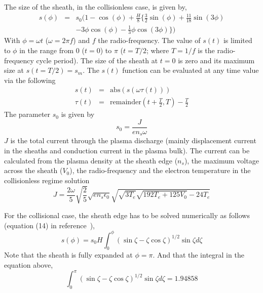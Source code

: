 The size of the sheath, in the collisionless case, is given by, 
\begin{eqnarray}\label{eq:CollisionlessSheathEdge}
s(\phi) &=& s_0 ( 1 - \cos(\phi) + \frac{H}{8} \{ \frac32 \sin(\phi)  + \frac{11}{18} \sin(3 \phi) \nonumber \\ 
        & & - 3 \phi \cos(\phi)  - \frac13 \phi \cos(3 \phi)  \} )
\end{eqnarray}
With $\phi = \omega t$ ($\omega = 2 \pi f$) and $f$ the radio-frequency. The value of $s(t)$ is limited to $\phi$ in the range from 0 ($t=0$) to $\pi$ ($t=T/2$; where $T=1/f$ is the radio-frequency cycle period). The size of the sheath at $t=0$ is zero and its maximum size at $s(t=T/2) = s_m$. The $s(t)$ function can be evaluated at any time value via the following 
\begin{eqnarray}
s(t)    &=& \text{abs}(s(\omega \tau(t))) \\
\tau(t) &=& \text{remainder}\left(t+\frac{T}{2},T\right) - \frac{T}{2} 
\end{eqnarray}
The parameter $s_0$ is given by 
\begin{equation}
s_0 = \frac{J}{e n_s \omega}
\end{equation}
$J$ is the total current through the plasma discharge (mainly displacement current in the sheaths and conduction current in the plasma bulk). The current can be calculated from the plasma density at the sheath edge ($n_s$), the maximum voltage across the sheath ($V_0$), the radio-frequency and the electron temperature in the collisionless regime solution~\cite{Lieberman1988}
\begin{equation}
J = \frac{2 \omega}{5} \sqrt{\frac25} \sqrt{e n_s \epsilon_0} \sqrt{ \sqrt{3 T_e} \sqrt{192 T_e + 125 V_0} -24 T_e    }
\end{equation}

For the collisional case, the sheath edge has to be solved numerically as follows (equation (14) in reference~\cite{Lieberman1989}), 
\begin{equation}\label{eq:CollisionalSheathEdge}
s(\phi) = s_0  H \int_0^{\phi} (\sin \zeta - \zeta \cos \zeta)^{1/2} \sin \zeta d \zeta 
\end{equation}
Note that the sheath is fully expanded at $\phi = \pi$. And that the integral in the equation above,
\begin{equation}
\int_0^{\pi} (\sin \zeta - \zeta \cos \zeta)^{1/2} \sin \zeta d \zeta = 1.94858
\end{equation} 

